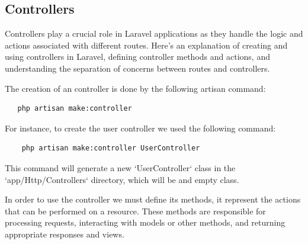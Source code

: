 \subsection{Controllers}

Controllers play a crucial role in Laravel applications as they handle the logic and actions associated with different routes. Here's an explanation of creating and using controllers in Laravel, defining controller methods and actions, and understanding the separation of concerns between routes and controllers.

The creation of an controller is done by the following artisan command: 
\begin{verbatim}
   php artisan make:controller
\end{verbatim}

For instance, to create the user controller we used the following command: 
\begin{verbatim}
    php artisan make:controller UserController 
\end{verbatim}

This command will generate a new `UserController` class in the `app/Http/Controllers` directory, which will be and empty class. 

In order to use the controller we must define its methods, it represent the actions that can be performed on a resource. These methods are responsible for processing requests, interacting with models or other methods, and returning appropriate responses and views.


